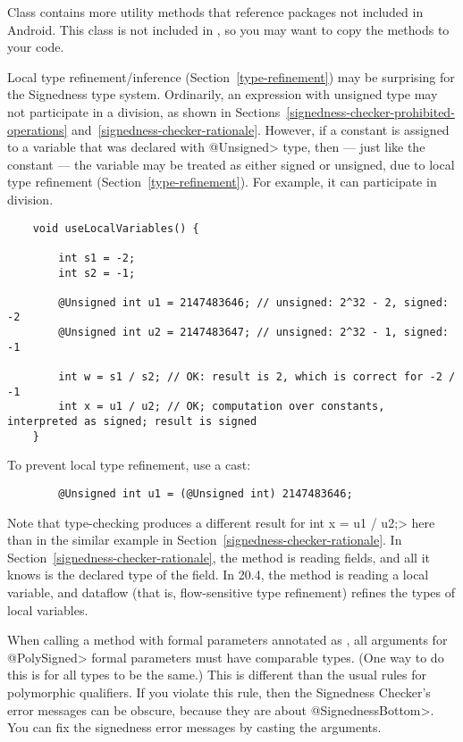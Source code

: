 Class  contains more utility
methods that reference packages not included in Android.  This class is not
included in , so you may want to copy the methods to your code.



Local type refinement/inference (Section~\ref{type-refinement}) may be
surprising for the Signedness type system.  Ordinarily, an expression with
unsigned type may not participate in a division, as shown in
Sections~\ref{signedness-checker-prohibited-operations}
and~\ref{signedness-checker-rationale}.  However, if a constant is assigned
to a variable that was declared with \<@Unsigned> type, then --- just like
the constant --- the variable may be treated as either signed or unsigned,
due to local type refinement (Section~\ref{type-refinement}).
For example, it can participate in division.

\begin{Verbatim}
    void useLocalVariables() {

        int s1 = -2;
        int s2 = -1;

        @Unsigned int u1 = 2147483646; // unsigned: 2^32 - 2, signed: -2
        @Unsigned int u2 = 2147483647; // unsigned: 2^32 - 1, signed: -1

        int w = s1 / s2; // OK: result is 2, which is correct for -2 / -1
        int x = u1 / u2; // OK; computation over constants, interpreted as signed; result is signed
    }
\end{Verbatim}

To prevent local type refinement, use a cast:
\begin{Verbatim}
        @Unsigned int u1 = (@Unsigned int) 2147483646;
\end{Verbatim}

Note that type-checking produces a different result for \<int x = u1 / u2;>
here than in the similar example in
Section~\ref{signedness-checker-rationale}.  In
Section~\ref{signedness-checker-rationale}, the method is reading fields,
and all it knows is the declared type of the field.  In 20.4, the method is
reading a local variable, and dataflow (that is, flow-sensitive type
refinement) refines the types of local variables.



When calling a method with formal parameters annotated as
, all arguments for
\<@PolySigned> formal parameters must have comparable types.  (One way to
do this is for all types to be the same.)  This is different than the usual
rules for polymorphic qualifiers.  If you violate this rule, then the
Signedness Checker's error messages can be obscure, because they are about
\<@SignednessBottom>.  You can fix the signedness error messages by casting
the arguments.


